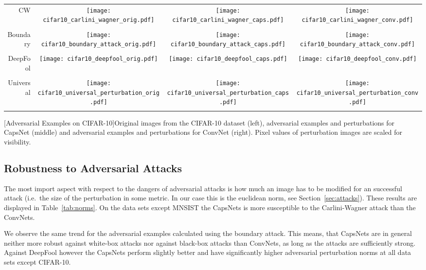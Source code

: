 \begin{center}
\begin{longtable*}{rccc}
	
	CW & \texttt{[image: cifar10\_carlini\_wagner\_orig.pdf]} & \texttt{[image: cifar10\_carlini\_wagner\_caps.pdf]} & \texttt{[image: cifar10\_carlini\_wagner\_conv.pdf]}\\
	\\
	Boundary & \texttt{[image: cifar10\_boundary\_attack\_orig.pdf]} & \texttt{[image: cifar10\_boundary\_attack\_caps.pdf]} & \texttt{[image: cifar10\_boundary\_attack\_conv.pdf]}\\
	\\
	DeepFool & \texttt{[image: cifar10\_deepfool\_orig.pdf]} & \texttt{[image: cifar10\_deepfool\_caps.pdf]} & \texttt{[image: cifar10\_deepfool\_conv.pdf]}\\
	\\
	Universal & \texttt{[image: cifar10\_universal\_perturbation\_orig.pdf]} & \texttt{[image: cifar10\_universal\_perturbation\_caps.pdf]} & \texttt{[image: cifar10\_universal\_perturbation\_conv.pdf]}\\
	\\
\end{longtable*}
[Adversarial Examples on CIFAR-10]{Original images from the CIFAR-10 dataset (left), adversarial examples and perturbations for CapsNet (middle) and adversarial examples and perturbations for ConvNet (right). Pixel values of perturbation images are scaled for visibility.}
\label{tab:images}
\end{center}

\subsection{Robustness to Adversarial Attacks}

The most import aspect with respect to the dangers of adversarial attacks is how much an image has to be modified for an successful attack (i.e.\ the size of the perturbation in some metric. In our case this is the euclidean norm, see Section~\ref{sec:attacks}).
These results are displayed in Table~\ref{tab:norms}. On the data sets except MNSIST the CapsNets is more susceptible to the Carlini-Wagner attack than the ConvNets.

We observe the same trend for the adversarial examples calculated using the boundary attack. This means, that CapsNets are in general neither more robust against white-box attacks nor against black-box attacks than ConvNets, as long as the attacks are sufficiently strong.
Against DeepFool however the CapsNets perform slightly better and have significantly higher adversarial perturbation norms at all data sets except CIFAR-10.

